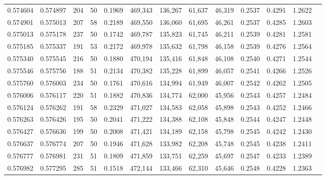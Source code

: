 \begin{tabular}{rrrrrrrrrrrrr}
0.574604 & 0.574897 &   204 &  50 &                                     0.1969 & 469,343 & 136,267 &  61,637 &  46,319 & 0.2537 & 0.4291 & 1.2622 \\
0.574901 & 0.575013 &   207 &  58 &                                     0.2189 & 469,550 & 136,060 &  61,695 &  46,261 & 0.2537 & 0.4285 & 1.2603 \\
0.575013 & 0.575178 &   237 &  50 &                                     0.1742 & 469,787 & 135,823 &  61,745 &  46,211 & 0.2539 & 0.4281 & 1.2581 \\
0.575185 & 0.575337 &   191 &  53 &                                     0.2172 & 469,978 & 135,632 &  61,798 &  46,158 & 0.2539 & 0.4276 & 1.2564 \\
0.575340 & 0.575545 &   216 &  50 &                                     0.1880 & 470,194 & 135,416 &  61,848 &  46,108 & 0.2540 & 0.4271 & 1.2544 \\
0.575546 & 0.575756 &   188 &  51 &                                     0.2134 & 470,382 & 135,228 &  61,899 &  46,057 & 0.2541 & 0.4266 & 1.2526 \\
0.575760 & 0.576003 &   234 &  50 &                                     0.1761 & 470,616 & 134,994 &  61,949 &  46,007 & 0.2542 & 0.4262 & 1.2505 \\
0.576006 & 0.576117 &   220 &  51 &                                     0.1882 & 470,836 & 134,774 &  62,000 &  45,956 & 0.2543 & 0.4257 & 1.2484 \\
0.576124 & 0.576262 &   191 &  58 &                                     0.2329 & 471,027 & 134,583 &  62,058 &  45,898 & 0.2543 & 0.4252 & 1.2466 \\
0.576263 & 0.576426 &   195 &  50 &                                     0.2041 & 471,222 & 134,388 &  62,108 &  45,848 & 0.2544 & 0.4247 & 1.2448 \\
0.576427 & 0.576636 &   199 &  50 &                                     0.2008 & 471,421 & 134,189 &  62,158 &  45,798 & 0.2545 & 0.4242 & 1.2430 \\
0.576637 & 0.576774 &   207 &  50 &                                     0.1946 & 471,628 & 133,982 &  62,208 &  45,748 & 0.2545 & 0.4238 & 1.2411 \\
0.576777 & 0.576981 &   231 &  51 &                                     0.1809 & 471,859 & 133,751 &  62,259 &  45,697 & 0.2547 & 0.4233 & 1.2389 \\
0.576982 & 0.577295 &   285 &  51 &                                     0.1518 & 472,144 & 133,466 &  62,310 &  45,646 & 0.2548 & 0.4228 & 1.2363 \\

\end{tabular}
